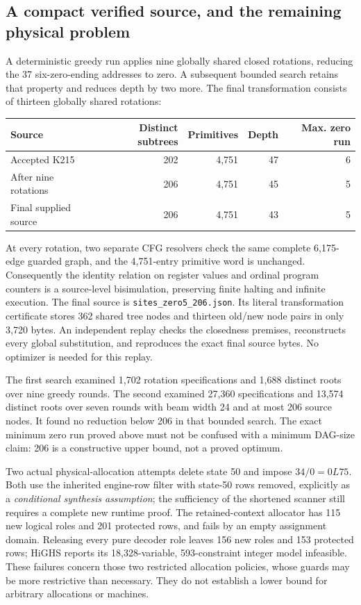 \subsection{A compact verified source, and the remaining physical problem}

A deterministic greedy run applies nine globally shared closed rotations,
reducing the 37 six-zero-ending addresses to zero.  A subsequent bounded
search retains that property and reduces depth by two more.  The final
transformation consists of thirteen globally shared rotations:

\begin{center}
\begin{tabular}{lrrrr}
Source & Distinct subtrees & Primitives & Depth & Max. zero run\\\hline
Accepted K215 & 202 & 4,751 & 47 & 6\\
After nine rotations & 206 & 4,751 & 45 & 5\\
Final supplied source & 206 & 4,751 & 43 & 5
\end{tabular}
\end{center}

At every rotation, two separate CFG resolvers check the same complete
6,175-edge guarded graph, and the 4,751-entry primitive word is unchanged.
Consequently the identity relation on register values and ordinal program
counters is a source-level bisimulation, preserving finite halting and
infinite execution.  The final source is
\texttt{sites\_zero5\_206.json}.  Its literal transformation certificate
stores 362 shared tree nodes and thirteen old/new node pairs in only
3,720 bytes.  An independent replay checks the closedness premises,
reconstructs every global substitution, and reproduces the exact final
source bytes.  No optimizer is needed for this replay.

The first search examined 1,702 rotation specifications and 1,688 distinct
roots over nine greedy rounds.  The second examined 27,360 specifications
and 13,574 distinct roots over seven rounds with beam width 24 and at most
206 source nodes.  It found no reduction below 206 in that bounded search.
The exact minimum zero run proved above must not be confused with a minimum
DAG-size claim: 206 is a constructive upper bound, not a proved optimum.

Two actual physical-allocation attempts delete state 50 and impose
$34/0=0L75$.  Both use the inherited engine-row filter with state-50 rows
removed, explicitly as a \emph{conditional synthesis assumption}; the
sufficiency of the shortened scanner still requires a complete new runtime
proof.  The retained-context allocator has 115 new logical roles and 201
protected rows, and fails by an empty assignment domain.  Releasing every
pure decoder role leaves 156 new roles and 153 protected rows; HiGHS reports
its 18,328-variable, 593-constraint integer model infeasible.  These failures
concern those two restricted allocation policies, whose guards may be more
restrictive than necessary.  They do not establish a lower bound for
arbitrary allocations or machines.

